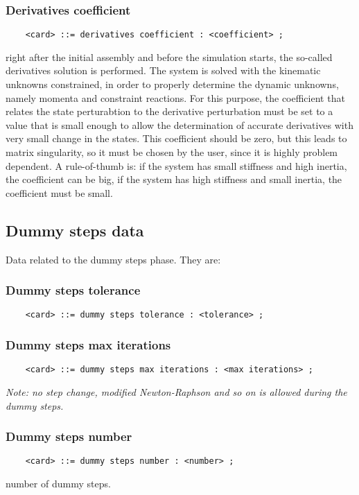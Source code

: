 \subsubsection{Derivatives coefficient}
\begin{verbatim}
    <card> ::= derivatives coefficient : <coefficient> ;
\end{verbatim}
right after the initial assembly and before the simulation starts, the
so-called derivatives solution is performed. The system is solved with
the kinematic unknowns constrained, in order to properly determine the
dynamic unknowns, namely momenta and constraint reactions. For this
purpose, the coefficient that relates the state perturabtion to the
derivative perturbation must be set to a value that is small enough to
allow the determination of accurate derivatives with very small change
in the states. This coefficient should be zero, but this leads to matrix
singularity, so it must be chosen by the user, since it is highly
problem dependent. A rule-of-thumb is: if the system has small
stiffness and high inertia, the coefficient can be big, if the system
has high stiffness and small inertia, the coefficient must be small.


\subsection{Dummy steps data}
Data related to the dummy steps phase. They are:

\subsubsection{Dummy steps tolerance}
\begin{verbatim}
    <card> ::= dummy steps tolerance : <tolerance> ;
\end{verbatim}

\subsubsection{Dummy steps max iterations}
\begin{verbatim}
    <card> ::= dummy steps max iterations : <max iterations> ;
\end{verbatim}    
{\em
    Note: no step change, modified Newton-Raphson and so on is allowed
    during the dummy steps.
}

\subsubsection{Dummy steps number}
\begin{verbatim}
    <card> ::= dummy steps number : <number> ;
\end{verbatim}
number of dummy steps.

